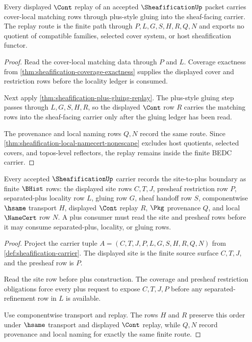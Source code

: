 \begin{theorem}
\label{thm:sheafification-cover-local-gluing-replay}
Every displayed $\Cont$ replay of an accepted $\SheafificationUp$ packet carries cover-local matching rows through plus-style gluing into the sheaf-facing carrier. The replay route is the finite path through $P,L,G,S,H,R,Q,N$ and exports no quotient of compatible families, selected cover system, or host sheafification functor.
\end{theorem}
\begin{proof}
Read the cover-local matching data through $P$ and $L$. Coverage exactness from \autoref{thm:sheafification-coverage-exactness} supplies the displayed cover and restriction rows before the locality ledger is consumed.

Next apply \autoref{thm:sheafification-plus-gluing-replay}. The plus-style gluing step passes through $L,G,S,H,R$, so the displayed $\Cont$ row $R$ carries the matching rows into the sheaf-facing carrier only after the gluing ledger has been read.

The provenance and local naming rows $Q,N$ record the same route. Since \autoref{thm:sheafification-local-namecert-nonescape} excludes host quotients, selected covers, and topos-level reflectors, the replay remains inside the finite BEDC carrier.
\end{proof}

\begin{theorem}
\label{thm:sheafification-site-plus-boundary-obligations}
Every accepted $\SheafificationUp$ carrier records the site-to-plus boundary as finite $\BHist$ rows: the displayed site rows $C,T,J$, presheaf restriction row $P$, separated-plus locality row $L$, gluing row $G$, sheaf handoff row $S$, componentwise $\hsame$ transport $H$, displayed $\Cont$ replay $R$, $\Pkg$ provenance $Q$, and local $\NameCert$ row $N$. A plus consumer must read the site and presheaf rows before it may consume separated-plus, locality, or gluing rows.
\end{theorem}
\begin{proof}
Project the carrier tuple $A=(C,T,J,P,L,G,S,H,R,Q,N)$ from \autoref{def:sheafification-carrier}. The displayed site is the finite source surface $C,T,J$, and the presheaf row is $P$.

Read the site row before plus construction. The coverage and presheaf restriction obligations force every plus request to expose $C,T,J,P$ before any separated-refinement row in $L$ is available.

Use componentwise transport and replay. The rows $H$ and $R$ preserve this order under $\hsame$ transport and displayed $\Cont$ replay, while $Q,N$ record provenance and local naming for exactly the same finite route.
\end{proof}

